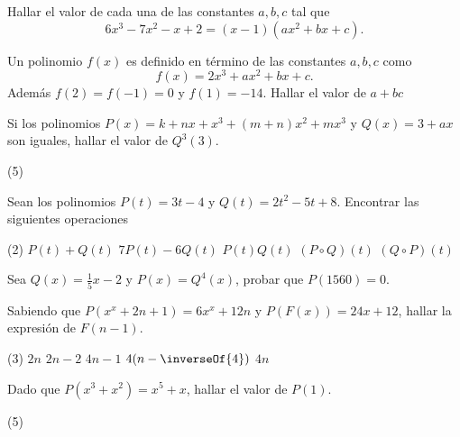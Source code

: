 \begin{multicols}{2}
    \begin{exercise}
        Hallar el valor de cada una de las constantes $a, b, c$ tal que
        \[
            6x^3 - 7x^2 - x + 2 = (x - 1)(ax^2 + bx + c).
        \]
    \end{exercise}

    \begin{exercise}
        Un polinomio $f(x)$ es definido en término de las constantes $a, b, c$ como
        \[
            f(x) = 2x^3 + ax^2 + bx + c.
        \]
        Además $f(2) = f(-1) = 0$ y $f(1) = -14$.
        Hallar el valor de $a + bc$
    \end{exercise}

    \begin{exercise}
        Si los polinomios $P(x) = k + nx + x^3 + (m + n)x^2 + mx^3$ y $Q(x) = 3 + ax$ son iguales, hallar el valor de $Q^3(3)$.
        \begin{tasks}(5)
        \end{tasks}
    \end{exercise}

    \begin{exercise}
        Sean los polinomios $P(t) = 3t - 4$ y $Q(t) = 2t^2 - 5t + 8$.
        Encontrar las siguientes operaciones
        \begin{tasks}(2)
            \task $P(t) + Q(t)$
            \task $7P(t) - 6Q(t)$
            \task $P(t)Q(t)$
            \task $(P \circ Q)(t)$
            \task $(Q \circ P)(t)$
        \end{tasks}
    \end{exercise}

    \begin{exercise}
        Sea $Q(x) = \frac{1}{5} x - 2$ y $P(x) = Q^4(x)$, probar que $P(1560) = 0$.
    \end{exercise}

    \begin{exercise}
        Sabiendo que $P(x^x + 2n + 1) = 6x^x + 12n$ y $P\left(F(x)\right) = 24x + 12$, hallar la expresión de $F(n - 1)$.
        \begin{tasks}[label=\Alph*)](3)
        \task $2n$
        \task $2n - 2$
        \task $4n - 1$
        \task $4(n - \inverseOf{4})$
        \task $4n$
        \end{tasks}
    \end{exercise}

    \begin{exercise}
        Dado que $P(x^3 + x^2) = x^5 + x$, hallar el valor de $P(1)$.
        \begin{tasks}[label=\Alph*)](5)
        \end{tasks}
    \end{exercise}


\end{multicols}
